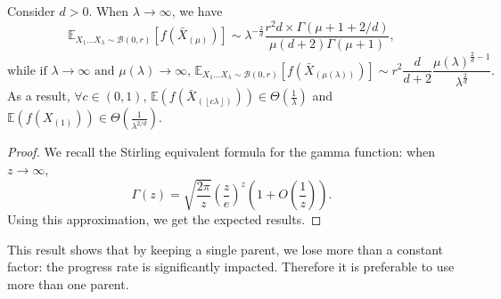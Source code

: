 \begin{coro}\label{cor:equiv}
Consider $d>0$.
When $\lambda\rightarrow\infty$, we have
$$\mathbb{E}_{X_{1}\ldots X_{\lambda}\sim\mathcal{B}(0,r)}\left[ f(\bar X_{(\mu)})\right]\sim \lambda^{-\frac{2}{d}}\frac{r^2d\times\Gamma(\mu+1+2/d)}{\mu(d+2)\Gamma(\mu+1)},$$
$$\mbox{while if $\lambda\rightarrow \infty$ and $\mu(\lambda)\rightarrow\infty$,~}
\mathbb{E}_{X_{1}\ldots X_{\lambda}\sim\mathcal{B}(0,r)}\left[ f(\bar X_{(\mu(\lambda))})\right]\sim r^2\frac{ d}{d+2}\frac{\mu(\lambda)^{\frac{2}{d}-1}}{\lambda^{\frac{2}{d}}}.$$
As a result, $\forall c\in(0,1)$, $\mathbb{E}\left(f(\bar X_{(\left\lfloor c\lambda\right\rfloor)})\right)\in \Theta\left(\frac1\lambda\right)$ and $\mathbb{E}\left(f(X_{(1)})\right)\in \Theta\left(\frac{1}{\lambda^{2/d}}\right)$.
\end{coro}
\begin{proof}
We recall the Stirling equivalent formula for the gamma function: when $z\rightarrow\infty$,
$$\Gamma(z) = \sqrt{\frac{2\pi}{z}}\left(\frac{z}{e}\right)^z\left(1+O\left(\frac{1}{z}\right)\right).$$
Using this approximation, we get the expected results.
\end{proof}
This result shows that by keeping a single parent, we lose more than a constant factor: the progress rate is significantly impacted. Therefore it is preferable to use more than one parent.%
